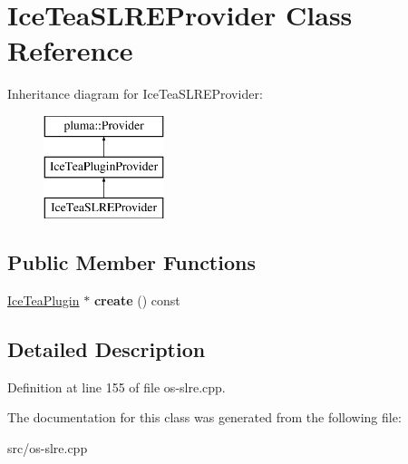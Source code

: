 \hypertarget{class_ice_tea_s_l_r_e_provider}{}\section{Ice\+Tea\+S\+L\+R\+E\+Provider Class Reference}
\label{class_ice_tea_s_l_r_e_provider}
Inheritance diagram for Ice\+Tea\+S\+L\+R\+E\+Provider\+:\begin{figure}[H]
\begin{center}
\leavevmode
\includegraphics[height=3.000000cm]{class_ice_tea_s_l_r_e_provider}
\end{center}
\end{figure}
\subsection*{Public Member Functions}
\begin{DoxyCompactItemize}
\item 
\hyperlink{class_ice_tea_plugin}{Ice\+Tea\+Plugin} $\ast$ {\bfseries create} () const \hypertarget{class_ice_tea_s_l_r_e_provider_a25fbe5a549a8d5d8f13254a3e8b1bece}{}\label{class_ice_tea_s_l_r_e_provider_a25fbe5a549a8d5d8f13254a3e8b1bece}

\end{DoxyCompactItemize}


\subsection{Detailed Description}


Definition at line 155 of file os-\/slre.\+cpp.



The documentation for this class was generated from the following file\+:\begin{DoxyCompactItemize}
\item 
src/os-\/slre.\+cpp\end{DoxyCompactItemize}

